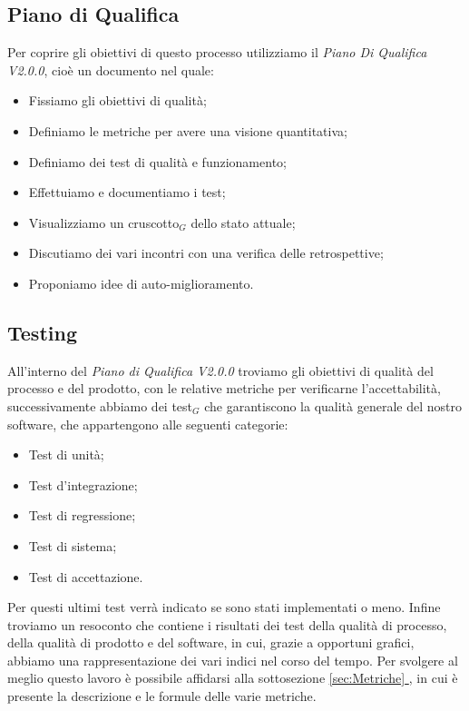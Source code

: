  \subsection{Piano di Qualifica}
  Per coprire gli obiettivi di questo processo utilizziamo il \textit{Piano Di Qualifica V2.0.0}, cioè un documento nel quale:
  \begin{itemize}
      \item Fissiamo gli obiettivi di qualità;
      \item Definiamo le metriche per avere una visione quantitativa;
      \item Definiamo dei test di qualità e funzionamento;
      \item Effettuiamo e documentiamo i test;
      \item Visualizziamo un cruscotto$_G$ dello stato attuale;
      \item Discutiamo dei vari incontri con una verifica delle retrospettive;
      \item Proponiamo idee di auto-miglioramento.
  \end{itemize}

  \subsection{Testing}
  All'interno del \textit{Piano di Qualifica V2.0.0} troviamo gli obiettivi di qualità del processo e del prodotto, con le relative metriche per verificarne l'accettabilità, successivamente abbiamo dei test$_G$ che garantiscono la qualità generale del nostro software, che appartengono alle seguenti categorie:
  \begin{itemize}
      \item Test di unità;
      \item Test d'integrazione;
      \item Test di regressione;
      \item Test di sistema;
      \item Test di accettazione.
  \end{itemize}
  Per questi ultimi test verrà indicato se sono stati implementati o meno.
  \newline
  Infine troviamo un resoconto che contiene i risultati dei test della qualità di processo, della qualità di prodotto e del software, in cui, grazie a opportuni grafici, abbiamo una rappresentazione dei vari indici nel corso del tempo. Per svolgere al meglio questo lavoro è possibile affidarsi alla sottosezione \underline{\ref{sec:Metriche} }, in cui è presente la descrizione e le formule delle varie metriche.


